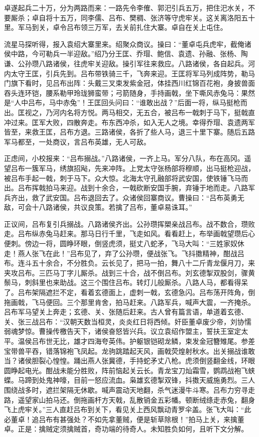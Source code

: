 卓遂起兵二十万，分为两路而来：一路先令李傕、郭汜引兵五万，把住汜水关，不要厮杀；卓自将十五万，同李儒、吕布、樊稠、张济等守虎牢关。这关离洛阳五十里。军马到关，卓令吕布领三万军，去关前扎住大寨。卓自在关上屯住。

流星马探听得，报入袁绍大寨里来。绍聚众商议。操曰：“董卓屯兵虎牢，截俺诸侯中路，今可勒兵一半迎敌。”绍乃分王匡、乔瑁、鲍信、袁遗、孙融、张杨、陶谦、公孙瓒八路诸侯，往虎牢关迎敌。操引军往来救应。八路诸侯，各自起兵。河内太守王匡，引兵先到。吕布带铁骑三千，飞奔来迎。王匡将军马列成阵势，勒马门旗下看时，见吕布出阵：头戴三叉束发紫金冠，体挂西川红锦百花袍，身披兽面吞头连环铠，腰系勒甲玲珑狮蛮带；弓箭随身，手持画戟，坐下嘶风赤兔马：果然是“人中吕布，马中赤兔”！王匡回头问曰：“谁敢出战？”后面一将，纵马挺枪而出。匡视之，乃河内名将方悦。两马相交，无五合，被吕布一戟刺于马下，挺戟直冲过来。匡军大败，四散奔走。布东西冲杀，如入无人之境。幸得乔瑁、袁遗两军皆至，来救王匡，吕布方退。三路诸侯，各折了些人马，退三十里下寨。随后五路军马都至，一处商议，言吕布英雄，无人可敌。

正虑间，小校报来：“吕布搦战。”八路诸侯，一齐上马。军分八队，布在高冈。遥望吕布一簇军马，绣旗招飐，先来冲阵。上党太守张杨部将穆顺，出马挺枪迎战，被吕布手起一戟，刺于马下。众大惊。北海太守孔融部将武安国，使铁锤飞马而出。吕布挥戟拍马来迎。战到十余合，一戟砍断安国手腕，弃锤于地而走。八路军兵齐出，救了武安国。吕布退回去了。众诸侯回寨商议。曹操曰：“吕布英勇无敌，可会十八路诸侯，共议良策。若擒了吕布，董卓易诛耳。”

正议间，吕布复引兵搦战。八路诸侯齐出。公孙瓒挥槊亲战吕布。战不数合，瓒败走。吕布纵赤兔马赶来。那马日行千里，飞走如风。看看赶上，布举画戟望瓒后心便刺。傍边一将，圆睁环眼，倒竖虎须，挺丈八蛇矛，飞马大叫：“三姓家奴休走！燕人张飞在此！”吕布见了，弃了公孙瓒，便战张飞。飞抖擞精神，酣战吕布。连斗五十余合，不分胜负。云长见了，把马一拍，舞八十二斤青龙偃月刀，来夹攻吕布。三匹马丁字儿厮杀。战到三十合，战不倒吕布。刘玄德掣双股剑，骤黄鬃马，刺斜里也来助战。这三个围住吕布。转灯儿般厮杀。八路人马，都看得呆了。吕布架隔遮拦不定，看着玄德面上，虚刺一戟，玄德急闪。吕布荡开阵角，倒拖画戟，飞马便回。三个那里肯舍，拍马赶来。八路军兵，喊声大震，一齐掩杀。吕布军马望关上奔走；玄德、关、张随后赶来。古人曾有篇言语，单道着玄德、关、张三战吕布：“汉朝天数当桓灵，炎炎红日将西倾。奸臣董卓废少帝，刘协懦弱魂梦惊。曹操传檄告天下，诸侯奋怒皆兴兵。议立袁绍作盟主，誓扶王室定太平。温侯吕布世无比，雄才四海夸英伟。护躯银铠砌龙鳞，束发金冠簪雉尾。参差宝带兽平吞，错落锦袍飞凤起。龙驹跳踏起天风，画戟荧煌射秋水。出关搦战谁敢当？诸侯胆裂心惶惶。踊出燕人张冀德，手持蛇矛丈八枪。虎须倒竖翻金线，环眼圆睁起电光。酣战未能分胜败，阵前恼起关云长。青龙宝刀灿霜雪，鹦鹉战袍飞蛱蝶。马蹄到处鬼神嚎，目前一怒应流血。枭雄玄德掣双锋，抖擞天威施勇烈。三人围绕战多时，遮拦架隔无休歇。喊声震动天地翻，杀气迷漫牛斗寒。吕布力穷寻走路，遥望家山拍马还。倒拖画杆方天戟，乱散销金五彩幡。顿断绒绦走赤兔，翻身飞上虎牢关。”三人直赶吕布到关下，看见关上西风飘动青罗伞盖。张飞大叫：“此必董卓！追吕布有甚强处？不如先拿董贼，便是斩草除根！”拍马上关，来擒董卓。正是：擒贼定须擒贼首，奇功端的待奇人。未知胜负如何，且听下文分解。